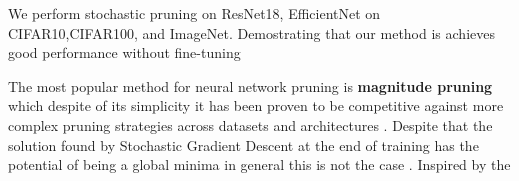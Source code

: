 We perform  stochastic pruning on ResNet18, EfficientNet on CIFAR10,CIFAR100,
and ImageNet. Demostrating that our method is achieves good performance
without fine-tuning 







    The most popular method for neural network pruning is \textbf{magnitude
    pruning}  which despite of its simplicity  it has been proven to be competitive against more complex pruning
    strategies across datasets and architectures
    \cite{guptaComplexityRequiredNeural2022}. Despite that the solution found
    by Stochastic Gradient Descent at the end of training has the potential of
    being a global minima \cite{leeGradientDescentOnly2016,luDepthCreatesNo2017,
    zhouSGDConvergesGlobal2018,kawaguchiDeepLearningPoor2016} in general this
    is not the case \cite{dingSubOptimalLocalMinima2020}. Inspired by
    the




